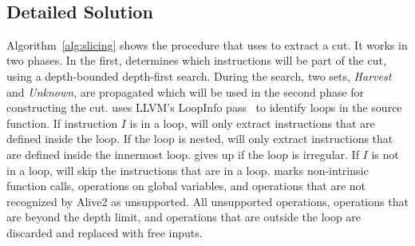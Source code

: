 \begin{algorithm}[tbp]
\begin{algorithmic}[1]
    \EndFor
  \EndIf

    \EndIf

  \EndWhile

  \\
  \EndFunction
  \end{algorithmic}
  \label{alg:slicing}
\end{algorithm}


\subsection{Detailed Solution}

Algorithm~\ref{alg:slicing} shows the procedure that \minotaur{} uses to
extract a cut.
%
It works in two phases.
%
In the first, \minotaur{} determines which instructions will be part
of the cut, using a depth-bounded depth-first search.
%
During the search, two sets, \emph{Harvest} and \emph{Unknown}, are
propagated which will be used in the second phase for constructing the
cut.
%
\minotaur{} uses LLVM's LoopInfo pass~\cite{loopinfo} to identify loops in the
source function.
%
If instruction $I$ is in a loop, \minotaur{} will only extract
instructions that are defined inside the loop.
If the loop is nested, \minotaur{} will only extract instructions that are
defined inside the innermost loop.
%
\minotaur{} gives up if the loop is irregular.
%
If $I$ is not in a loop, \minotaur{} will skip the instructions that are in a loop.
%
\minotaur{} marks non-intrinsic function calls, operations on global
variables, and operations that are not recognized by Alive2 as
unsupported.
%
All unsupported operations, operations that are beyond the depth
limit, and operations that are outside the loop are discarded and
replaced with free inputs.


